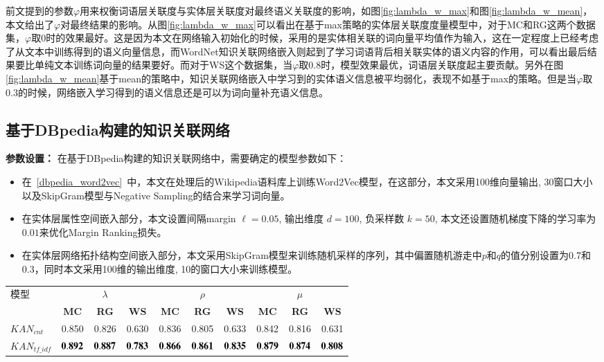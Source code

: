 前文提到的参数$\varphi$用来权衡词语层关联度与实体层关联度对最终语义关联度的影响，如图\ref{fig:lambda_w_max}和图\ref{fig:lambda_w_mean}，本文给出了$\varphi$对最终结果的影响。从图\ref{fig:lambda_w_max}可以看出在基于max策略的实体层关联度度量模型中，对于MC和RG这两个数据集，$\varphi$取$0$时的效果最好。这是因为本文在网络输入初始化的时候，采用的是实体相关联的词向量平均值作为输入，这在一定程度上已经考虑了从文本中训练得到的语义向量信息，而WordNet知识关联网络嵌入则起到了学习词语背后相关联实体的语义内容的作用，可以看出最后结果要比单纯文本训练词向量的结果要好。而对于WS这个数据集，当$\varphi$取$0.8$时，模型效果最优，词语层关联度起主要贡献。另外在图\ref{fig:lambda_w_mean}基于mean的策略中，知识关联网络嵌入中学习到的实体语义信息被平均弱化，表现不如基于max的策略。但是当$\varphi$取$0.3$的时候，网络嵌入学习得到的语义信息还是可以为词向量补充语义信息。

\subsection{基于DBpedia构建的知识关联网络}
\textbf{参数设置：}
在基于DBpedia构建的知识关联网络中，需要确定的模型参数如下：
\begin{itemize}
    \item 在~\ref{dbpedia_word2vec}~中，本文在处理后的Wikipedia语料库上训练Word2Vec模型，在这部分，本文采用100维向量输出, 30窗口大小以及SkipGram模型与Negative Sampling的结合来学习词向量。
    \item 在实体层属性空间嵌入部分，本文设置间隔margin $\ell=0.05$, 输出维度 $d=100$, 负采样数 $k=50$, 本文还设置随机梯度下降的学习率为$0.01$来优化Margin Ranking损失。
    \item 在实体层网络拓扑结构空间嵌入部分，本文采用SkipGram模型来训练随机采样的序列，其中偏置随机游走中$p$和$q$的值分别设置为0.7和0.3，同时本文采用100维的输出维度, 10的窗口大小来训练模型。
\end{itemize}


\begin{table*}[htbp]
    \center
    \vspace{5pt}
    \begin{tabular}{|l|c|c|c|c|c|c|c|c|c|}
    \hline
    \multirow{2}{*}{模型} & \multicolumn{3}{c|}{$\lambda$}     & \multicolumn{3}{c|}{$\rho$}          & \multicolumn{3}{c|}{$\mu$} \\ \cline{2-10} 
                           & \textbf{MC}&\textbf{RG}&\textbf{WS} & \textbf{MC}&\textbf{RG}&\textbf{WS} & \textbf{MC}&\textbf{RG}&\textbf{WS}\\ \hline
    $KAN_{cnt}$            & 0.850 & 0.826 & 0.630 & 0.836 & 0.805 & 0.633 & 0.842 & 0.816 & 0.631   \\ \hline
    $KAN_{tf\_idf}$        & $\bf 0.892$  & $\bf 0.887$ & $\bf 0.783$ & $\bf 0.866$ & $\bf 0.861$ & $\bf 0.835$ & $\bf 0.879$ & $\bf 0.874$ & $\bf 0.808$ \\ \hline
    \end{tabular}
    \label{table5-6}
\end{table*}


